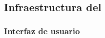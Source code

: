 \subsection{Infraestructura del }
\label{interfaz_usuario}

\subsubsection{Interfaz de usuario}
\label{interfaz_usuario}
